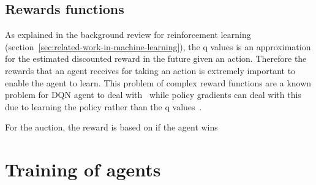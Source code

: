 \subsection{Rewards functions}\label{subsec:rewards-functions}
As explained in the background review for reinforcement learning (section~\ref{sec:related-work-in-machine-learning}),
the q values is an approximation for the estimated discounted reward in the future given an action. Therefore the
rewards that an agent receives for taking an action is extremely important to enable the agent to learn. This problem
of complex reward functions are a known problem for DQN agent to deal with~\citep{atari} while policy gradients can
deal with this due to learning the policy rather than the q values~\citep{Sutton1998}.

For the auction, the reward is based on if the agent wins

\section{Training of agents}\label{sec:training-of-agents}
